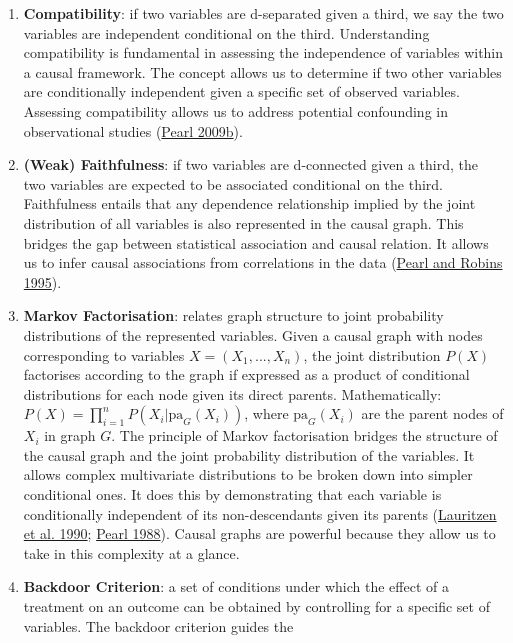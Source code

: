 \documentclass[
  singlecolumn]{report}
\begin{document}
\begin{enumerate}
\def\labelenumi{\arabic{enumi}.}
\setcounter{enumi}{7}
\item
  \textbf{Compatibility}: if two variables are d-separated given a
  third, we say the two variables are independent conditional on the
  third. Understanding compatibility is fundamental in assessing the
  independence of variables within a causal framework. The concept
  allows us to determine if two other variables are conditionally
  independent given a specific set of observed variables. Assessing
  compatibility allows us to address potential confounding in
  observational studies (\protect\hyperlink{ref-pearl2009a}{Pearl
  2009b}).
\item
  \textbf{(Weak) Faithfulness}: if two variables are d-connected given a
  third, the two variables are expected to be associated conditional on
  the third. Faithfulness entails that any dependence relationship
  implied by the joint distribution of all variables is also represented
  in the causal graph. This bridges the gap between statistical
  association and causal relation. It allows us to infer causal
  associations from correlations in the data
  (\protect\hyperlink{ref-pearl1995a}{Pearl and Robins 1995}).
\item
  \textbf{Markov Factorisation}: relates graph structure to joint
  probability distributions of the represented variables. Given a causal
  graph with nodes corresponding to variables \(X = (X_1, ..., X_n)\),
  the joint distribution \(P(X)\) factorises according to the graph if
  expressed as a product of conditional distributions for each node
  given its direct parents. Mathematically:
  \(P(X) = \prod_{i=1}^{n} P(X_i | \text{pa}_G(X_i))\), where
  \(\text{pa}_G(X_i)\) are the parent nodes of \(X_i\) in graph \(G\).
  The principle of Markov factorisation bridges the structure of the
  causal graph and the joint probability distribution of the variables.
  It allows complex multivariate distributions to be broken down into
  simpler conditional ones. It does this by demonstrating that each
  variable is conditionally independent of its non-descendants given its
  parents (\protect\hyperlink{ref-lauritzen1990}{Lauritzen et al. 1990};
  \protect\hyperlink{ref-pearl1988}{Pearl 1988}). Causal graphs are
  powerful because they allow us to take in this complexity at a glance.
\item
  \textbf{Backdoor Criterion}: a set of conditions under which the
  effect of a treatment on an outcome can be obtained by controlling for
  a specific set of variables. The backdoor criterion guides the

\end{enumerate}
\end{document}
